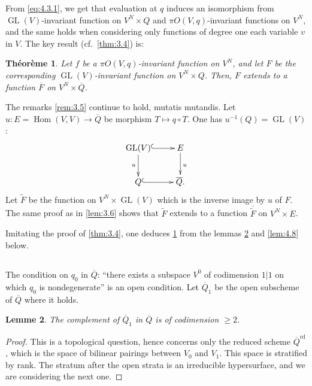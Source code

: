 \documentclass[11pt,a4paper]{article}
\theoremstyle{plain}
\newtheorem{theorem}{Th\'eor\`eme}
\newtheorem{lemma}[theorem]{Lemme}
\theoremstyle{definition}
\DeclareMathOperator{\Hom}{Hom}
\DeclareMathOperator{\GL}{GL}
\begin{document}
From \eqref{eq:4.3.1}, we get that evaluation at $q$ induces an isomorphism from $\GL(V)$-invariant function on $V^N \times Q$ and $\pi O(V,q)$-invariant functions on $V^N$, and the same holds when considering only functions of degree one each variable $v$ in $V$. The key result (cf.~\ref{thm:3.4}) is:

\begin{theorem}\label{thm:4.5}
Let $f$ be a $\pi O(V,q)$-invariant function on $V^N$, and let $F$ be the corresponding $\GL(V)$-invariant function on $V^N \times Q$. Then, $F$ extends to a function $\overline{F}$ on $V^N \times \overline{Q}$.
\end{theorem}

The remarks \ref{rem:3.5} continue to hold, mutatis mutandis. Let $u : E = \Hom(V,V) \to \overline{Q}$ be morphism $T \mapsto q \circ T$. One has $u^{-1}(Q) = \GL(V)$:
\begin{equation}\label{eq:4.5.1}
\xymatrix{
\GL(V) \ar@{^{(}->}[r] \ar[d]_{u} & E \ar[d]^{u} \\
Q \ar@{^{(}->}[r] & \overline{Q}.
}
\end{equation}
Let $\widetilde{F}$ be the function on $V^N \times \GL(V)$ which is the inverse image by $u$ of $F$. The same proof as in \ref{lem:3.6} shows that $\widetilde{F}$ extends to a function $\overline{\widetilde{F}}$ on $V^N \times E$.

Imitating the proof of \ref{thm:3.4}, one deduces \ref{thm:4.5} from the lemmas \ref{lem:4.7} and \ref{lem:4.8} below.

\subsection{}
The condition on $q_0$ in $\overline{Q}$: ``there exists a subspace $V^0$ of codimension $1|1$ on which $q_0$ is nondegenerate'' is an open condition. Let $\overline{Q}_1$ be the open subscheme of $\overline{Q}$ where it holds.

\begin{lemma}\label{lem:4.7}
The complement of $\overline{Q}_1$ in $\overline{Q}$ is of codimension $\geq 2$.
\end{lemma}

\begin{proof}
This is a topological question, hence concerns only the reduced scheme $\overline{Q}^{\mathrm{rd}}$, which is the space of bilinear pairings between $V_0$ and $V_1$. This space is stratified by rank. The stratum after the open strata is an irreducible hypersurface, and we are considering the next one.
\end{proof}
\end{document}
